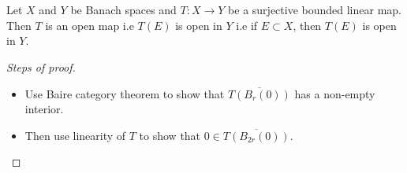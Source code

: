
\chapter{}
\begin{theorem}
  Let $X$ and $Y$ be Banach spaces and $T: X \to Y$ be a surjective bounded linear map. Then $T$ is an open map i.e $T(E)$ is open in $Y$ i.e if $E \subset X$, then $T(E)$ is open in $Y$.
\end{theorem}
\begin{proof}[Steps of proof]
  \begin{itemize}
      See Prof. Blecher's Notes on Functional Analysis
    \item Use Baire category theorem to show that $\overline{T(B_r(0))}$ has a non-empty interior.
    \item Then use linearity of $T$ to show that $0 \in \overline{T(B_{2r}(0))}$.
  \end{itemize}
\end{proof}
